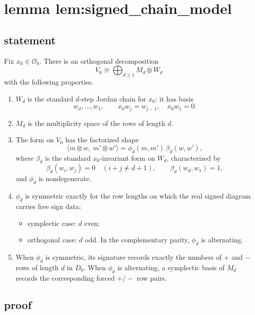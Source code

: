 \documentclass[
]{article}
\providecommand{\tightlist}{%
  \setlength{\itemsep}{0pt}\setlength{\parskip}{0pt}}
\begin{document}
\section{lemma
lem:signed\_chain\_model}\label{lemma-lemsigned_chain_model}

\subsection{statement}\label{statement-1}

Fix \(x_0\in \mathcal O_0\). There is an orthogonal decomposition \[
V_0\cong \bigoplus_{d\ge 1} M_d\otimes W_d
\] with the following properties.

\begin{enumerate}
\def\labelenumi{\arabic{enumi}.}
\tightlist
\item
  \(W_d\) is the standard \(d\)-step Jordan chain for \(x_0\): it has
  basis \[
  w_d,\dots,w_1,\qquad x_0 w_j=w_{j-1},\quad x_0w_1=0.
  \]
\item
  \(M_d\) is the multiplicity space of the rows of length \(d\).
\item
  The form on \(V_0\) has the factorized shape \[
  \langle m\otimes w,\ m'\otimes w'\rangle
  =
  \phi_d(m,m')\,\beta_d(w,w'),
  \] where \(\beta_d\) is the standard \(x_0\)-invariant form on
  \(W_d\), characterized by \[
  \beta_d(w_i,w_j)=0\quad(i+j\neq d+1),\qquad \beta_d(w_d,w_1)=1,
  \] and \(\phi_d\) is nondegenerate.
\item
  \(\phi_d\) is symmetric exactly for the row lengths on which the real
  signed diagram carries free sign data:

  \begin{itemize}
  \tightlist
  \item
    symplectic case: \(d\) even;
  \item
    orthogonal case: \(d\) odd. In the complementary parity, \(\phi_d\)
    is alternating.
  \end{itemize}
\item
  When \(\phi_d\) is symmetric, its signature records exactly the
  numbers of \(+\) and \(-\) rows of length \(d\) in \(D_0\). When
  \(\phi_d\) is alternating, a symplectic basis of \(M_d\) records the
  corresponding forced \(+/-\) row pairs.
\end{enumerate}

\subsection{proof}\label{proof-1}
\end{document}
